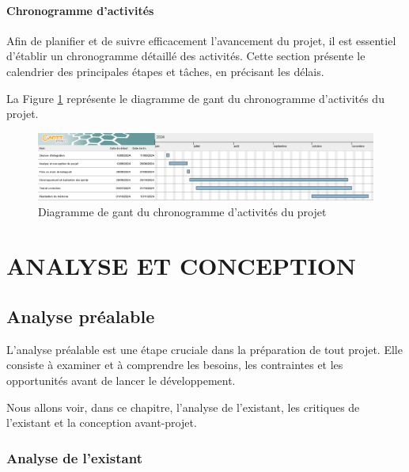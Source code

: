 \documentclass[12pt]{report}
\begin{document}
				\subsection{Chronogramme d'activités}

				\hspace{15pt} Afin de planifier et de suivre efficacement l'avancement du projet, il est essentiel d'établir un chronogramme détaillé des activités. Cette section présente le calendrier des principales étapes et tâches, en précisant les délais.

				 La Figure \ref{fig:Chronogramme} représente le diagramme de gant du chronogramme d'activités du projet.

				\begin{figure}[h]
					\centering
					\includegraphics[width=\textwidth]{image6.png}
					\caption{Diagramme de gant du chronogramme d'activités du projet}
					\label{fig:Chronogramme}
				\end{figure}
				\FloatBarrier







				\part{ANALYSE ET CONCEPTION}
				\chapter{Analyse préalable}
				
				\hspace{15pt}L'analyse préalable est une étape cruciale dans la préparation de tout projet. Elle consiste à examiner et à comprendre les besoins, les contraintes et les opportunités avant de lancer le développement.

				 Nous allons voir, dans ce chapitre, l’analyse de l’existant, les critiques de l’existant et la conception avant-projet.

				\section{Analyse de l'existant}
				
\end{document}
